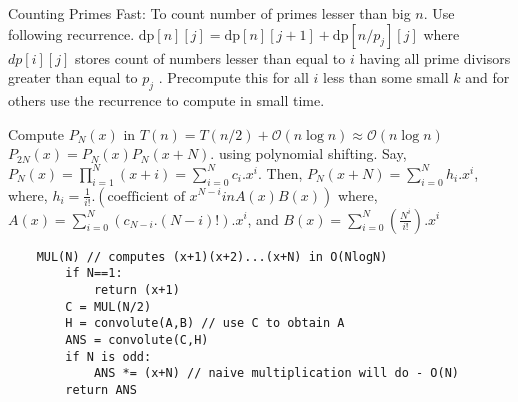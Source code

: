Counting Primes Fast:  To count number of primes lesser than big $n$. Use following recurrence.
$\text{dp}[n][j] =\text{dp}[n][j + 1] + \text{dp}[n/p_j][j]$ where $dp[i][j]$ stores count of numbers lesser than equal to $i$
having all prime divisors greater than equal to $p_j$ . Precompute this for all $i$ less than some small $k$
and for others use the recurrence to compute in small time.

Compute $P_N(x)$ in $T(n)=T(n/2)+\mathcal{O}(n\log n)\approx \mathcal{O}(n\log n)$ $P_{2N}(x) = P_{N}(x)P_{N}(x+N)$. using polynomial shifting. Say, $P_N(x) = \prod \limits_{i=1}^N (x+i) = \sum_{i=0}^N c_i.x^i$.
Then, $P_N(x+N) = \sum_{i=0}^N h_i.x^i$, where, $h_i = \frac{1}{i!} . (\text{coefficient of } x^{N-i} in A(x)B(x))$ where, $A(x) = \sum \limits_{i=0}^{N} (c_{N-i}.(N-i)!) . x^i$, and $B(x) = \sum \limits_{i=0}^{N} \left( \frac {N^i}{i!} \right) . x^i$

\begin{verbatim}
    MUL(N) // computes (x+1)(x+2)...(x+N) in O(NlogN)
        if N==1:
            return (x+1)
        C = MUL(N/2)
        H = convolute(A,B) // use C to obtain A
        ANS = convolute(C,H)
        if N is odd:
            ANS *= (x+N) // naive multiplication will do - O(N)
        return ANS
\end{verbatim}